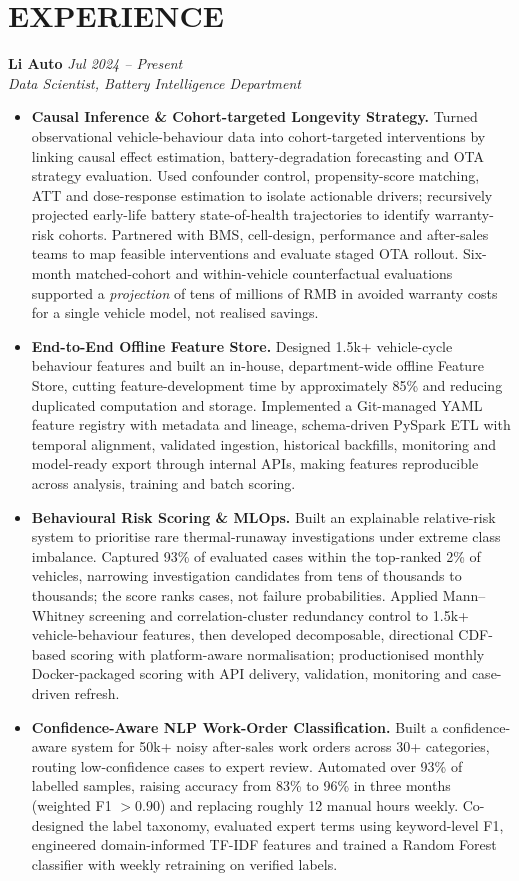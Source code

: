 \documentclass[a4paper,10pt]{article}
\begin{document}
\section{EXPERIENCE}
\textbf{Li Auto} \hfill \textit{Jul 2024 -- Present}\\
\textit{Data Scientist, Battery Intelligence Department}
\begin{itemize}
\item \textbf{Causal Inference \& Cohort-targeted Longevity Strategy.} Turned observational vehicle-behaviour data into cohort-targeted interventions by linking causal effect estimation, battery-degradation forecasting and OTA strategy evaluation. Used confounder control, propensity-score matching, ATT and dose-response estimation to isolate actionable drivers; recursively projected early-life battery state-of-health trajectories to identify warranty-risk cohorts. Partnered with BMS, cell-design, performance and after-sales teams to map feasible interventions and evaluate staged OTA rollout. Six-month matched-cohort and within-vehicle counterfactual evaluations supported a \emph{projection} of tens of millions of RMB in avoided warranty costs for a single vehicle model, not realised savings.
\item \textbf{End-to-End Offline Feature Store.} Designed 1.5k+ vehicle-cycle behaviour features and built an in-house, department-wide offline Feature Store, cutting feature-development time by approximately 85\% and reducing duplicated computation and storage. Implemented a Git-managed YAML feature registry with metadata and lineage, schema-driven PySpark ETL with temporal alignment, validated ingestion, historical backfills, monitoring and model-ready export through internal APIs, making features reproducible across analysis, training and batch scoring.
\item \textbf{Behavioural Risk Scoring \& MLOps.} Built an explainable relative-risk system to prioritise rare thermal-runaway investigations under extreme class imbalance. Captured 93\% of evaluated cases within the top-ranked 2\% of vehicles, narrowing investigation candidates from tens of thousands to thousands; the score ranks cases, not failure probabilities. Applied Mann--Whitney screening and correlation-cluster redundancy control to 1.5k+ vehicle-behaviour features, then developed decomposable, directional CDF-based scoring with platform-aware normalisation; productionised monthly Docker-packaged scoring with API delivery, validation, monitoring and case-driven refresh.
\item \textbf{Confidence-Aware NLP Work-Order Classification.} Built a confidence-aware system for 50k+ noisy after-sales work orders across 30+ categories, routing low-confidence cases to expert review. Automated over 93\% of labelled samples, raising accuracy from 83\% to 96\% in three months (weighted F1 $>0.90$) and replacing roughly 12 manual hours weekly. Co-designed the label taxonomy, evaluated expert terms using keyword-level F1, engineered domain-informed TF-IDF features and trained a Random Forest classifier with weekly retraining on verified labels.
\end{itemize}
\end{document}
